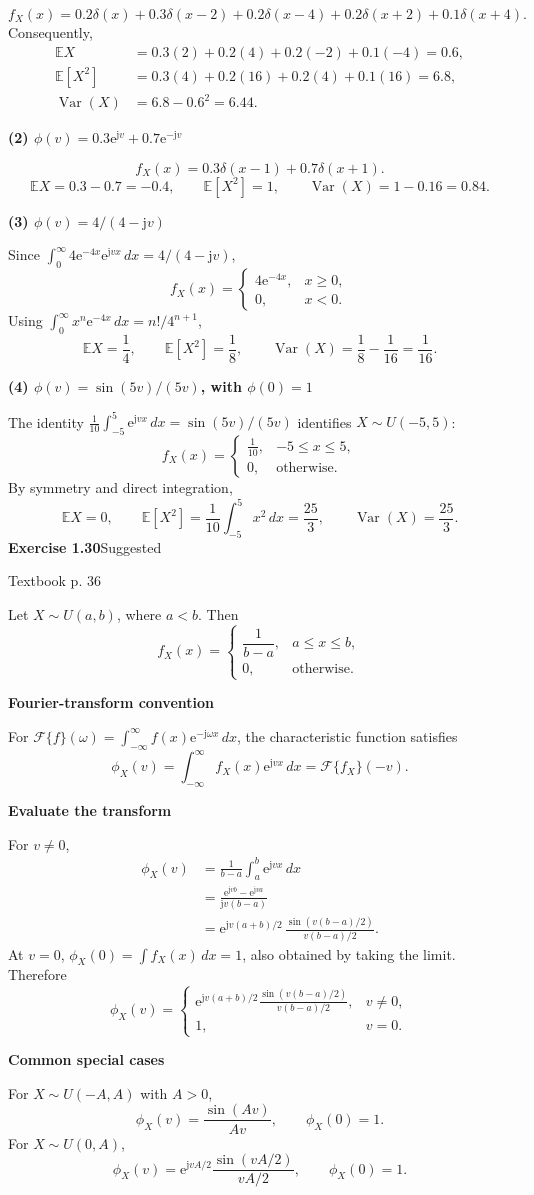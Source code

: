 \documentclass[a4paper,11pt]{article}
\newcommand{\E}{\mathbb E}\newcommand{\Var}{\operatorname{Var}}\newcommand{\Cov}{\operatorname{Cov}}
\newcommand{\jj}{\mathrm j}\newcommand{\ee}{\mathrm e}
\newcommand{\problem}[3]{{\LARGE\bfseries Exercise #1}\hfill #2\par{\small\color{gray}Textbook p. #3}\par\vspace{3mm}}
\newcommand{\step}[1]{\par\textbf{#1}\par}
\begin{document}
\[
f_X(x)=0.2\delta(x)+0.3\delta(x-2)+0.2\delta(x-4)
+0.2\delta(x+2)+0.1\delta(x+4).
\]
Consequently,
\begin{align*}
\E X&=0.3(2)+0.2(4)+0.2(-2)+0.1(-4)=\boxed{0.6},\\
\E[X^2]&=0.3(4)+0.2(16)+0.2(4)+0.1(16)=\boxed{6.8},\\
\Var(X)&=6.8-0.6^2=\boxed{6.44}.
\end{align*}
\step{(2) $\phi(v)=0.3\ee^{\jj v}+0.7\ee^{-\jj v}$}
\[
\boxed{f_X(x)=0.3\delta(x-1)+0.7\delta(x+1).}
\]
\[
\boxed{\E X=0.3-0.7=-0.4},\qquad
\boxed{\E[X^2]=1},\qquad\boxed{\Var(X)=1-0.16=0.84}.
\]
\step{(3) $\phi(v)=4/(4-\jj v)$}
Since $\int_0^\infty4\ee^{-4x}\ee^{\jj vx}\,dx=4/(4-\jj v)$,
\[
\boxed{f_X(x)=\begin{cases}4\ee^{-4x},&x\ge0,\\0,&x<0.\end{cases}}
\]
Using $\int_0^\infty x^n\ee^{-4x}\,dx=n!/4^{n+1}$,
\[
\boxed{\E X=\frac14},\qquad\boxed{\E[X^2]=\frac18},\qquad
\boxed{\Var(X)=\frac18-\frac1{16}=\frac1{16}}.
\]
\step{(4) $\phi(v)=\sin(5v)/(5v)$, with $\phi(0)=1$}
The identity $\frac1{10}\int_{-5}^5\ee^{\jj vx}\,dx=\sin(5v)/(5v)$ identifies $X\sim U(-5,5)$:
\[
\boxed{f_X(x)=\begin{cases}\tfrac1{10},&-5\le x\le5,\\0,&\text{otherwise}.\end{cases}}
\]
By symmetry and direct integration,
\[
\boxed{\E X=0},\qquad
\boxed{\E[X^2]=\frac1{10}\int_{-5}^5x^2\,dx=\frac{25}{3}},\qquad
\boxed{\Var(X)=\frac{25}{3}}.
\]
\newpage
\problem{1.30}{Suggested}{36}
Let $X\sim U(a,b)$, where $a<b$. Then
\[
f_X(x)=\begin{cases}\dfrac1{b-a},&a\le x\le b,\\[1mm]0,&\text{otherwise}.\end{cases}
\]
\step{Fourier-transform convention}
For $\mathcal F\{f\}(\omega)=\int_{-\infty}^{\infty}f(x)\ee^{-\jj\omega x}\,dx$,
the characteristic function satisfies
\[
\phi_X(v)=\int_{-\infty}^{\infty}f_X(x)\ee^{\jj vx}\,dx
=\mathcal F\{f_X\}(-v).
\]
\step{Evaluate the transform}
For $v\ne0$,
\begin{align*}
\phi_X(v)&=\frac1{b-a}\int_a^b\ee^{\jj vx}\,dx\\
&=\frac{\ee^{\jj vb}-\ee^{\jj va}}{\jj v(b-a)}\\
&=\ee^{\jj v(a+b)/2}\,
\frac{\sin\!\left(v(b-a)/2\right)}{v(b-a)/2}.
\end{align*}
At $v=0$, $\phi_X(0)=\int f_X(x)\,dx=1$, also obtained by taking the limit.
Therefore
\[
\boxed{\phi_X(v)=\begin{cases}
\displaystyle\ee^{\jj v(a+b)/2}\frac{\sin\!\left(v(b-a)/2\right)}{v(b-a)/2},&v\ne0,\\[3mm]
1,&v=0.
\end{cases}}
\]
\step{Common special cases}
For $X\sim U(-A,A)$ with $A>0$,
\[
\phi_X(v)=\frac{\sin(Av)}{Av},\qquad\phi_X(0)=1.
\]
For $X\sim U(0,A)$,
\[
\phi_X(v)=\ee^{\jj vA/2}\frac{\sin(vA/2)}{vA/2},\qquad\phi_X(0)=1.
\]
\end{document}

